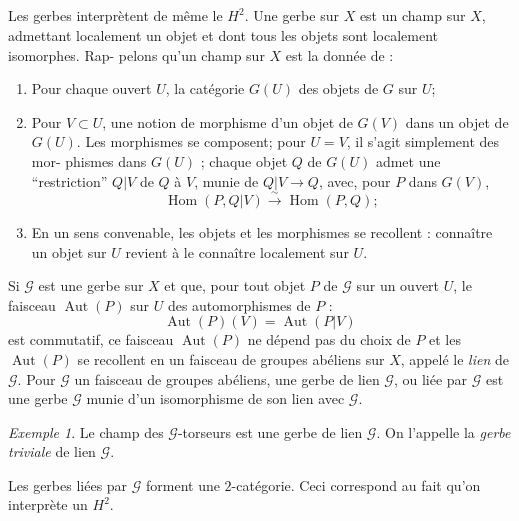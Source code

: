 \documentclass[12pt,a4paper]{article}
\theoremstyle{plain}
\theoremstyle{definition}
\theoremstyle{remark}
\newtheorem{example}[theorem]{Exemple}
\DeclareMathOperator{\Hom}{Hom}
\DeclareMathOperator{\Aut}{Aut}
\providecommand{\Hom}{\operatorname{Hom}}
\providecommand{\Aut}{\operatorname{Aut}}
\begin{document}
\subsection{}

Les gerbes interprètent de même le $H^2$. Une gerbe sur $X$ est un champ sur $X$,
admettant localement un objet et dont tous les objets sont localement isomorphes. Rap-
pelons qu'un champ sur $X$ est la donnée de :
\begin{enumerate}[label=(C\arabic*)]
\item Pour chaque ouvert $U$, la catégorie $G(U)$ des objets de $G$ sur $U$;
\item Pour $V \subset U$, une notion de morphisme d'un objet de $G(V)$ dans un objet
de $G(U)$. Les morphismes se composent; pour $U = V$, il s'agit simplement des mor-
phismes dans $G(U)$ ; chaque objet $Q$ de $G(U)$ admet une ``restriction'' $Q|V$ de $Q$ à $V$,
munie de $Q|V \to Q$, avec, pour $P$ dans $G(V)$,
\[
\Hom(P, Q|V) \xrightarrow{\sim} \Hom(P, Q);
\]
\item En un sens convenable, les objets et les morphismes se recollent : connaître
un objet sur $U$ revient à le connaître localement sur $U$.
\end{enumerate}

Si $\mathscr{G}$ est une gerbe sur $X$ et que, pour tout objet $P$ de $\mathscr{G}$ sur un ouvert $U$, le
faisceau $\Aut(P)$ sur $U$ des automorphismes de $P$ :
\[
\Aut(P)(V) = \Aut(P|V)
\]
est commutatif, ce faisceau $\Aut(P)$ ne dépend pas du choix de $P$ et les $\Aut(P)$ se recollent
en un faisceau de groupes abéliens sur $X$, appelé le \emph{lien} de $\mathscr{G}$. Pour $\mathscr{G}$ un faisceau de
groupes abéliens, une gerbe de lien $\mathscr{G}$, ou liée par $\mathscr{G}$ est une gerbe $\mathscr{G}$ munie d'un isomorphisme de son lien avec $\mathscr{G}$.

\begin{example}
Le champ des $\mathscr{G}$-torseurs est une gerbe de lien $\mathscr{G}$. On l'appelle la
\emph{gerbe triviale} de lien $\mathscr{G}$.
\end{example}

\begin{miseengarde}
Les gerbes liées par $\mathscr{G}$ forment une $2$-catégorie. Ceci correspond
au fait qu'on interprète un $H^2$.
\end{miseengarde}
\end{document}
